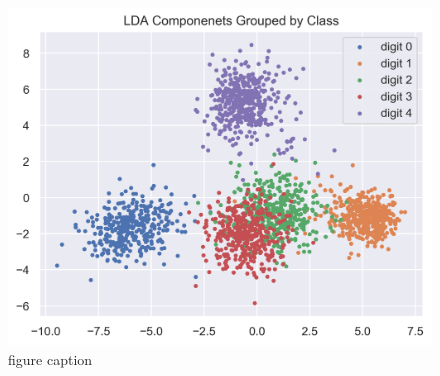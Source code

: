 \begin{figure}[htb]
 \centering
\includegraphics[width=\textwidth]{assignment1/2-5-LDA_dim_reduction.png}
\caption{\label{fig:fig7}figure caption}
\end{figure}